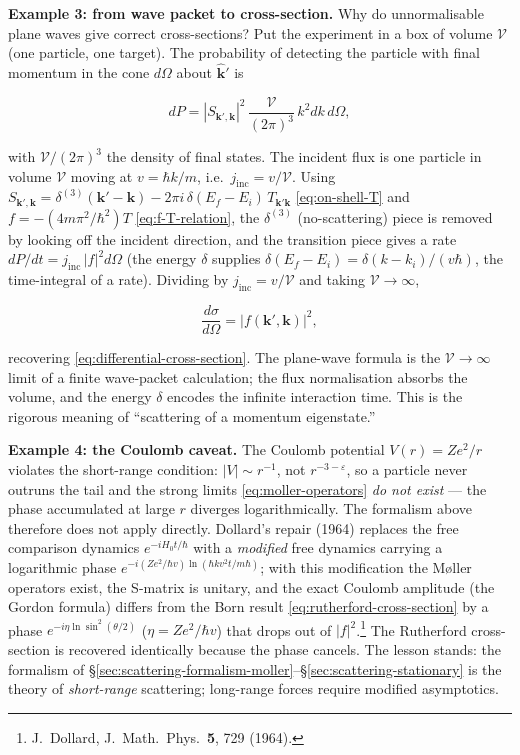 \medskip\noindent\textbf{Example 3: from wave packet to cross-section.} Why do unnormalisable plane waves give correct cross-sections? Put the experiment in a box of volume $\mathcal{V}$ (one particle, one target). The probability of detecting the particle with final momentum in the cone $d\Omega$ about $\hat{\bm k}'$ is
\begin{linenomath}
\begin{equation}
dP = |S_{\bm k',\bm k}|^{2}\,\frac{\mathcal{V}}{(2\pi)^{3}}\,k^{2}dk\,d\Omega,
\label{eq:scattering-probability}
\end{equation}
\end{linenomath}
with $\mathcal{V}/(2\pi)^{3}$ the density of final states. The incident flux is one particle in volume $\mathcal{V}$ moving at $v=\hbar k/m$, i.e.\ $j_{\mathrm{inc}}=v/\mathcal{V}$. Using $S_{\bm k',\bm k}=\delta^{(3)}(\bm k'-\bm k)-2\pi i\,\delta(E_{f}-E_{i})\,T_{\bm k'\bm k}$ \eqref{eq:on-shell-T} and $f=-(4m\pi^{2}/\hbar^{2})T$ \eqref{eq:f-T-relation}, the $\delta^{(3)}$ (no-scattering) piece is removed by looking off the incident direction, and the transition piece gives a rate $dP/dt=j_{\mathrm{inc}}\,|f|^{2}d\Omega$ (the energy $\delta$ supplies $\delta(E_{f}-E_{i})=\delta(k-k_{i})/(v\hbar)$, the time-integral of a rate). Dividing by $j_{\mathrm{inc}}=v/\mathcal{V}$ and taking $\mathcal{V}\to\infty$,
\begin{linenomath}
\begin{equation*}
\frac{d\sigma}{d\Omega}=|f(\bm k',\bm k)|^{2},
\end{equation*}
\end{linenomath}
recovering \eqref{eq:differential-cross-section}. The plane-wave formula is the $\mathcal{V}\to\infty$ limit of a finite wave-packet calculation; the flux normalisation absorbs the volume, and the energy $\delta$ encodes the infinite interaction time. This is the rigorous meaning of ``scattering of a momentum eigenstate.''

\medskip\noindent\textbf{Example 4: the Coulomb caveat.} The Coulomb potential $V(r)=Ze^{2}/r$ violates the short-range condition: $|V|\sim r^{-1}$, not $r^{-3-\varepsilon}$, so a particle never outruns the tail and the strong limits \eqref{eq:moller-operators} \emph{do not exist} --- the phase accumulated at large $r$ diverges logarithmically. The formalism above therefore does not apply directly. Dollard's repair (1964) replaces the free comparison dynamics $e^{-iH_{0}t/\hbar}$ with a \emph{modified} free dynamics carrying a logarithmic phase $e^{-i(Ze^{2}/\hbar v)\ln(\hbar kv^{2}t/m\hbar)}$; with this modification the M\o{}ller operators exist, the S-matrix is unitary, and the exact Coulomb amplitude (the Gordon formula) differs from the Born result \eqref{eq:rutherford-cross-section} by a phase $e^{-i\eta\ln\sin^{2}(\theta/2)}$ ($\eta=Ze^{2}/\hbar v$) that drops out of $|f|^{2}$.\footnote{J.~Dollard, J.~Math.~Phys.~\textbf{5}, 729 (1964).} The Rutherford cross-section is recovered identically because the phase cancels. The lesson stands: the formalism of \S\ref{sec:scattering-formalism-moller}--\S\ref{sec:scattering-stationary} is the theory of \emph{short-range} scattering; long-range forces require modified asymptotics.

